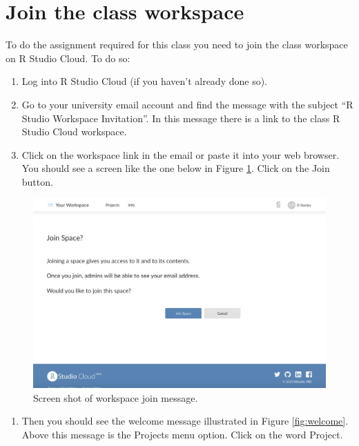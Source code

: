 \documentclass[
]{krantz}
\providecommand{\tightlist}{%
  \setlength{\itemsep}{0pt}\setlength{\parskip}{0pt}}
\begin{document}
\hypertarget{join-the-class-workspace}{%
\section{Join the class workspace}\label{join-the-class-workspace}}

To do the assignment required for this class you need to join the class workspace on R Studio Cloud. To do so:

\begin{enumerate}
\def\labelenumi{\arabic{enumi}.}
\item
  Log into R Studio Cloud (if you haven't already done so).
\item
  Go to your university email account and find the message with the subject ``R Studio Workspace Invitation''. In this message there is a link to the class R Studio Cloud workspace.
\item
  Click on the workspace link in the email or paste it into your web browser. You should see a screen like the one below in Figure \ref{fig:join}. Click on the Join button.
\end{enumerate}

\begin{figure}
\includegraphics[width=0.7\linewidth]{ch_introduction/images/screenshot_join} \caption{Screen shot of workspace join message.}\label{fig:join}
\end{figure}

\begin{enumerate}
\def\labelenumi{\arabic{enumi}.}
\setcounter{enumi}{3}
\tightlist
\item
  Then you should see the welcome message illustrated in Figure \ref{fig:welcome}. Above this message is the Projects menu option. Click on the word Project.
\end{enumerate}
\end{document}
